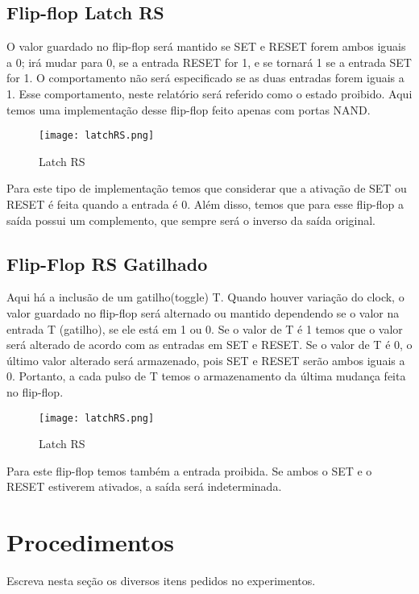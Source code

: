 \documentclass[12pt]{article}
\begin{document}
\subsection{Flip-flop Latch RS}
O valor guardado no flip-flop será mantido se SET e RESET forem ambos iguais a 0; irá mudar para 0, se a entrada RESET for 1, e se tornará 1 se a entrada SET for 1. O comportamento não será especificado se as duas entradas forem iguais a 1. Esse comportamento, neste relatório será referido como o estado proibido. Aqui temos uma implementação desse flip-flop feito apenas com portas NAND.

\begin{figure}[H]
	\centering
	\texttt{[image: latchRS.png]}
	\caption{Latch RS}
	\label{fig:latRS}
\end{figure}

Para este tipo de implementação temos que considerar que a ativação de SET ou RESET é feita quando a entrada é 0. Além disso, temos que para esse flip-flop a saída possui um complemento, que sempre será o inverso da saída original.

\subsection{Flip-Flop RS Gatilhado}

Aqui há a inclusão de um gatilho(toggle) T. Quando houver variação do clock, o valor guardado no flip-flop será alternado ou mantido dependendo se o valor na entrada T (gatilho), se ele está em 1 ou 0. Se o valor de T é 1 temos que o valor será alterado de acordo com as entradas em SET e RESET. Se o valor de T é 0, o último valor alterado será armazenado, pois SET e RESET serão ambos iguais a 0. Portanto, a cada pulso de T temos o armazenamento da última mudança feita no flip-flop. 

\begin{figure}[H]
	\centering
	\texttt{[image: latchRS.png]}
	\caption{Latch RS}
	\label{fig:latRS}
\end{figure}

Para este flip-flop temos também a entrada proibida. Se ambos o SET e o RESET estiverem ativados, a saída será indeterminada.


\section{Procedimentos}
\label{sec:Procedimentos}

Escreva nesta seção os diversos itens pedidos no experimentos. 
\end{document}

